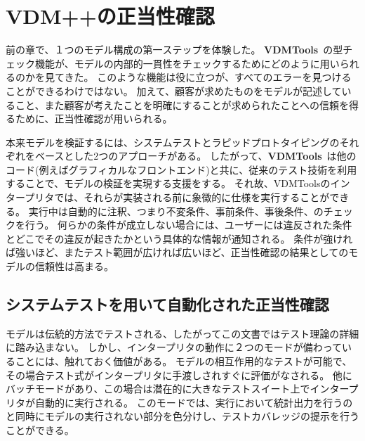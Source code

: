 \documentclass[\pformat,12pt,twoside]{jarticle}
\newcommand{\vdmtools}{\textbf{VDMTools}}
\begin{document}
\section{VDM++の正当性確認}

前の章で、１つのモデル構成の第一ステップを体験した。
\vdmtools\ の型チェック機能が、モデルの内部的一貫性をチェックするためにどのように用いられるのかを見てきた。
このような機能は役に立つが、すべてのエラーを見つけることができるわけではない。
加えて、顧客が求めたものをモデルが記述していること、また顧客が考えたことを明確にすることが求められたことへの信頼を得るために、正当性確認が用いられる。

本来モデルを検証するには、システムテストとラピッドプロトタイピングのそれぞれをベースとした2つのアプローチがある。
したがって、\vdmtools\ は他のコード(例えばグラフィカルなフロントエンド)と共に、従来のテスト技術を利用することで、モデルの検証を実現する支援をする。
それ故、VDMToolsのインタープリタでは、それらが実装される前に象徴的に仕様を実行することができる。
実行中は自動的に注釈、つまり不変条件、事前条件、事後条件、のチェックを行う。
何らかの条件が成立しない場合には、ユーザーには違反された条件とどこでその違反が起きたかという具体的な情報が通知される。
条件が強ければ強いほど、またテスト範囲が広ければ広いほど、正当性確認の結果としてのモデルの信頼性は高まる。

\subsection{システムテストを用いて自動化された正当性確認}

モデルは伝統的方法でテストされる、したがってこの文書ではテスト理論の詳細に踏み込まない。
しかし、インタープリタの動作に２つのモードが備わっていることには、触れておく価値がある。
モデルの相互作用的なテストが可能で、その場合テスト式がインタープリタに手渡しされすぐに評価がなされる。
他にバッチモードがあり、この場合は潜在的に大きなテストスイート上でインタープリタが自動的に実行される。
このモードでは、実行において統計出力を行うのと同時にモデルの実行されない部分を色分けし、テストカバレッジの提示を行うことができる。
\end{document}
